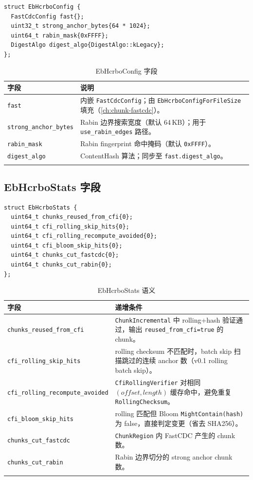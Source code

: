 \begin{lstlisting}[caption={EbHcrboConfig（\filepath{eb\_hcrbo.h}）},label={lst:eb-hcrbo-config}]
struct EbHcrboConfig {
  FastCdcConfig fast{};
  uint32_t strong_anchor_bytes{64 * 1024};
  uint64_t rabin_mask{0xFFFF};
  DigestAlgo digest_algo{DigestAlgo::kLegacy};
};
\end{lstlisting}

\begin{longtable}{@{}p{3.8cm}p{10.2cm}@{}}
\toprule
\textbf{字段} & \textbf{说明} \\
\midrule
\endhead
\texttt{fast} &
  内嵌 \texttt{FastCdcConfig}；由 \texttt{EbHcrboConfigForFileSize} 填充（\cref{ch:chunk-fastcdc}）。 \\
\texttt{strong\_anchor\_bytes} &
  Rabin 边界搜索宽度（默认 64\,KB）；用于 \texttt{use\_rabin\_edges} 路径。 \\
\texttt{rabin\_mask} &
  Rabin fingerprint 命中掩码（默认 \texttt{0xFFFF}）。 \\
\texttt{digest\_algo} &
  ContentHash 算法；同步至 \texttt{fast.digest\_algo}。 \\
\bottomrule
\caption{EbHcrboConfig 字段}
\label{tab:hcrbo-config}
\end{longtable}

\subsection{EbHcrboStats 字段}

\begin{lstlisting}[caption={EbHcrboStats 统计结构},label={lst:eb-hcrbo-stats}]
struct EbHcrboStats {
  uint64_t chunks_reused_from_cfi{0};
  uint64_t cfi_rolling_skip_hits{0};
  uint64_t cfi_rolling_recompute_avoided{0};
  uint64_t cfi_bloom_skip_hits{0};
  uint64_t chunks_cut_fastcdc{0};
  uint64_t chunks_cut_rabin{0};
};
\end{lstlisting}

\begin{longtable}{@{}p{4.5cm}p{9.5cm}@{}}
\toprule
\textbf{字段} & \textbf{递增条件} \\
\midrule
\endhead
\texttt{chunks\_reused\_from\_cfi} &
  \texttt{ChunkIncremental} 中 rolling+hash 验证通过，输出 \texttt{reused\_from\_cfi=true} 的 chunk。 \\
\texttt{cfi\_rolling\_skip\_hits} &
  rolling checksum 不匹配时，batch skip 扫描跳过的连续 anchor 数（v0.1 rolling batch skip）。 \\
\texttt{cfi\_rolling\_recompute\_avoided} &
  \texttt{CfiRollingVerifier} 对相同 $(offset,length)$ 缓存命中，避免重复 \texttt{RollingChecksum}。 \\
\texttt{cfi\_bloom\_skip\_hits} &
  rolling 匹配但 Bloom \texttt{MightContain(hash)} 为 false，直接判定变更（省去 SHA256）。 \\
\texttt{chunks\_cut\_fastcdc} &
  \texttt{ChunkRegion} 内 FastCDC 产生的 chunk 数。 \\
\texttt{chunks\_cut\_rabin} &
  Rabin 边界切分的 strong anchor chunk 数。 \\
\bottomrule
\caption{EbHcrboStats 语义}
\label{tab:hcrbo-stats}
\end{longtable}

